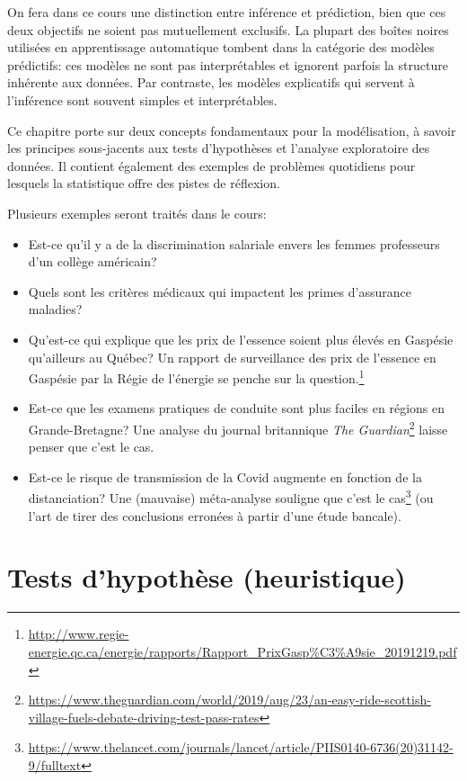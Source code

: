 \documentclass[
  11pt,
  letterpaper,
]{book}
\providecommand{\tightlist}{%
  \setlength{\itemsep}{0pt}\setlength{\parskip}{0pt}}
\renewcommand{\href}[2]{#2\footnote{\url{#1}}}
\begin{document}
On fera dans ce cours une distinction entre inférence et prédiction, bien que ces deux objectifs ne soient pas mutuellement exclusifs. La plupart des boîtes noires utilisées en apprentissage automatique tombent dans la catégorie des modèles prédictifs: ces modèles ne sont pas interprétables et ignorent parfois la structure inhérente aux données. Par contraste, les modèles explicatifs qui servent à l'inférence sont souvent simples et interprétables.

Ce chapitre porte sur deux concepts fondamentaux pour la modélisation, à savoir les principes sous-jacents aux tests d'hypothèses et l'analyse exploratoire des données. Il contient également des exemples de problèmes quotidiens pour lesquels la statistique offre des pistes de réflexion.

Plusieurs exemples seront traités dans le cours:

\begin{itemize}
\tightlist
\item
  Est-ce qu'il y a de la discrimination salariale envers les femmes professeurs d'un collège américain?
\item
  Quels sont les critères médicaux qui impactent les primes d'assurance maladies?
\item
  Qu'est-ce qui explique que les prix de l'essence soient plus élevés en Gaspésie qu'ailleurs au Québec? \href{http://www.regie-energie.qc.ca/energie/rapports/Rapport_PrixGasp\%C3\%A9sie_20191219.pdf}{Un rapport de surveillance des prix de l'essence en Gaspésie par la Régie de l'énergie se penche sur la question.}
\item
  Est-ce que les examens pratiques de conduite sont plus faciles en régions en Grande-Bretagne? \href{https://www.theguardian.com/world/2019/aug/23/an-easy-ride-scottish-village-fuels-debate-driving-test-pass-rates}{Une analyse du journal britannique \emph{The Guardian}} laisse penser que c'est le cas.
\item
  Est-ce le risque de transmission de la Covid augmente en fonction de la distanciation? \href{https://www.thelancet.com/journals/lancet/article/PIIS0140-6736(20)31142-9/fulltext}{Une (mauvaise) méta-analyse souligne que c'est le cas} (ou l'art de tirer des conclusions erronées à partir d'une étude bancale).
\end{itemize}

\hypertarget{tests-dhypothuxe8se-heuristique}{%
\section{Tests d'hypothèse (heuristique)}\label{tests-dhypothuxe8se-heuristique}}
\end{document}
